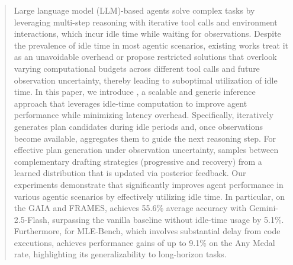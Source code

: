 \begin{abstract}
Large language model (LLM)-based agents solve complex tasks by leveraging multi-step reasoning with iterative tool calls and environment interactions, which incur idle time while waiting for observations. Despite the prevalence of idle time in most agentic scenarios, existing works treat it as an unavoidable overhead 
or propose restricted solutions that overlook varying computational budgets across different tool calls and future
observation uncertainty, thereby leading to suboptimal utilization of idle time. 
In this paper, we introduce \mname, a scalable and generic inference approach that leverages idle-time computation
 to improve agent performance while minimizing latency overhead. Specifically, \mname iteratively generates 
 plan candidates during idle periods and, once observations become available, aggregates them to guide the next reasoning step.
  For effective plan generation under observation uncertainty, \mname samples between complementary drafting strategies 
  (\ie progressive and recovery) from a learned distribution that is updated via posterior feedback. 
  Our experiments demonstrate that \mname significantly improves agent performance in various agentic scenarios 
  by effectively utilizing idle time. In particular, on the GAIA and FRAMES, \mname achieves 55.6\% average accuracy with Gemini-2.5-Flash, 
  surpassing the vanilla baseline without idle-time usage by 5.1\%. Furthermore, for MLE-Bench, which involves substantial delay from code executions, \mname achieves performance gains of up to 9.1\% on the Any Medal rate, highlighting its generalizability to long-horizon tasks.
\end{abstract}